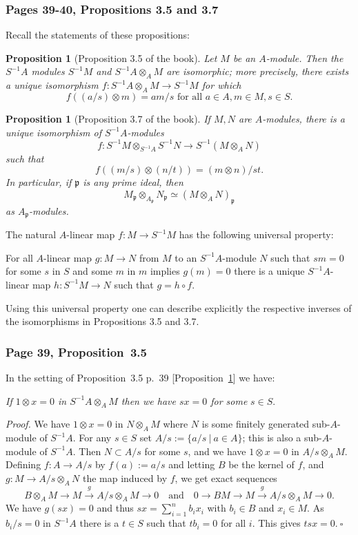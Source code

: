 \documentclass[12pt,letterpaper]{article}%
\newcommand{\mf}{\mathfrak}
\newcommand{\ppp}{\mf p}
\newcommand{\xr}{\xrightarrow}
\newcommand{\nn}{\noindent}
\newtheorem{prop}[thm]{Proposition}
\begin{document}
\subsubsection{Pages 39-40, Propositions 3.5 and 3.7}%

Recall the statements of these propositions:

\begin{prop}[Proposition 3.5 of the book]\label{p3.5}
Let $M$ be an $A$-module. Then the $S^{-1}A$ modules $S^{-1}M$ and $S^{-1}A \otimes_AM$ are isomorphic; more precisely, there exists a unique isomorphism $f:S^{-1}A\otimes_AM\to S^{-1}M$ for which
$$
f((a/s)\otimes m)=am/s\text{ for all }a\in A,m\in M,s\in S.
$$
\end{prop}

\begin{prop}[Proposition 3.7 of the book]\label{p3.7}
If $M,N$ are $A$-modules, there is a unique isomorphism of $S^{-1}A$-modules 
$$
f:S^{-1}M\otimes_{S^{-1}A}S^{-1}N\to S^{-1}(M\otimes_AN)
$$ 
such that 
$$
f((m/s)\otimes(n/t))=(m\otimes n)/st.
$$ 
In particular, if $\ppp$ is any prime ideal, then
$$
M_\ppp\otimes_{A_\ppp}N_\ppp\simeq(M\otimes_AN)_\ppp
$$ 
as $A_\ppp$-modules.
\end{prop}

The natural $A$-linear map $f:M\to S^{-1}M$ has the following universal property:

For all $A$-linear map $g:M\to N$ from $M$ to an $S^{-1}A$-module $N$ such that $sm=0$ for some $s$ in $S$ and some $m$ in $m$ implies $g(m)=0$ there is a unique $S^{-1}A$-linear map $h:S^{-1}M\to N$ such that $g=h\circ f$.

Using this universal property one can describe explicitly the respective inverses of the isomorphisms in Propositions 3.5 and 3.7.

\subsubsection{Page 39, Proposition~3.5}%

In the setting of Proposition~3.5 p.~39 [Proposition~\ref{p3.5}] we have:

\nn\emph{If $1\otimes x=0$ in $S^{-1}A\otimes_AM$ then we have $sx=0$ for some} $s\in S$.

\nn\emph{Proof.} We have $1\otimes x=0$ in $N\otimes_AM$ where $N$ is some finitely generated sub-$A$-module of $S^{-1}A$. For any $s\in S$ set $A/s:=\{a/s\ |\ a\in A\}$; this is also a sub-$A$-module of $S^{-1}A$. Then $N\subset A/s$ for some $s$, and we have $1\otimes x=0$ in $A/s\otimes_AM$. Defining $f:A\to A/s$ by $f(a):=a/s$ and letting $B$ be the kernel of $f$, and $g:M\to A/s\otimes_AN$ the map induced by $f$, we get exact sequences 
$$
B\otimes_AM\to M\xr gA/s\otimes_AM\to0\quad\text{and}\quad0\to BM\to M\xr gA/s\otimes_AM\to0.
$$ 
We have $g(sx)=0$ and thus $sx=\sum_{i=1}^nb_ix_i$ with $b_i\in B$ and $x_i\in M$. As $b_i/s=0$ in $S^{-1}A$ there is a $t\in S$ such that $tb_i=0$ for all $i$. This gives $tsx=0.\ \square$
\end{document}
